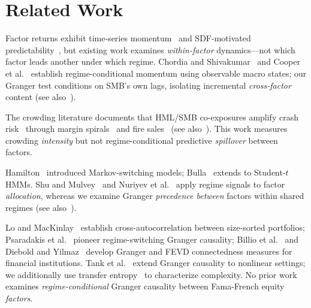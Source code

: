 \documentclass[sigconf,anonymous]{acmart}
\begin{document}
\section{Related Work}

Factor returns exhibit time-series momentum~\cite{ehsani2022factor,gupta2019factor}
and SDF-motivated predictability~\cite{haddad2020factor}, but existing work examines
\emph{within-factor} dynamics---not which factor leads another under which regime.
Chordia and Shivakumar~\cite{chordia2002momentum} and Cooper et al.~\cite{cooper2004market}
establish regime-conditional momentum using observable macro states; our Granger test
conditions on SMB's own lags, isolating incremental \emph{cross-factor} content
(see also~\cite{fama1993common,fama2015five,jegadeesh1993returns,carhart1997persistence,barroso2015momentum,daniel2016momentum,flogel2022momentum,neuhierl2024timing,asness2013value}).

The crowding literature documents that HML/SMB co-exposures amplify crash
risk~\cite{marks2019factor,chincarini2026crowded,betermier2025investor} through
margin spirals~\cite{brunnermeier2009market} and fire
sales~\cite{shleifer1997limits,coval2007asset}
(see also~\cite{stein2009presidential,anton2014connected,lou2022comomentum,kang2021crowding,greenwood2011stock}).
This work measures crowding \emph{intensity} but not regime-conditional
predictive \emph{spillover} between factors.

Hamilton~\cite{hamilton1989new} introduced Markov-switching models;
Bulla~\cite{bulla2011hidden} extends to Student-$t$ HMMs.
Shu and Mulvey~\cite{shu2025dynamic} and Nuriyev et al.~\cite{nuriyev2024regime}
apply regime signals to factor \emph{allocation}, whereas we examine Granger
\emph{precedence between} factors within shared regimes
(see also~\cite{krolzig1997markov,chincoli2017linear,ang2002regime,guidolin2007asset,oelschlager2024fhmm}).

Lo and MacKinlay~\cite{lo1990contrarian} establish cross-autocorrelation between
size-sorted portfolios; Psaradakis et al.~\cite{psaradakis2005markov} pioneer
regime-switching Granger causality; Billio et al.~\cite{billio2012econometric}
and Diebold and Yilmaz~\cite{diebold2012better} develop Granger and FEVD
connectedness measures for financial institutions.
Tank et al.~\cite{tank2022neural} extend Granger causality to nonlinear settings;
we additionally use transfer entropy~\cite{schreiber2000measuring,barnett2009granger}
to characterize complexity.
No prior work examines \emph{regime-conditional} Granger causality
between Fama-French equity \emph{factors}.
\end{document}
